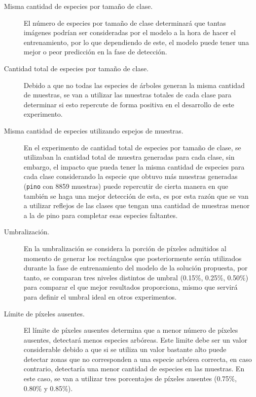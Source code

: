 \begin{description}
\item[Misma cantidad de especies por tamaño de clase.]{El número de especies por tamaño de clase determinará que tantas imágenes podrían ser consideradas por el modelo a la hora de hacer el entrenamiento, por lo que dependiendo de este, el modelo puede tener una mejor o peor predicción en la fase de detección.} 
\end{description}

\begin{description}
\item[Cantidad total de especies por tamaño de clase.]{Debido a que no todas las especies de árboles generan la misma cantidad de muestras, se van a utilizar las muestras totales de cada clase para determinar si esto repercute de forma positiva en el desarrollo de este experimento.}

\item[Misma cantidad de especies utilizando espejos de muestras.]{En el experimento de cantidad total de especies por tamaño de clase, se utilizaban la cantidad total de muestra generadas para cada clase, sin embargo, el impacto que pueda tener la misma cantidad de especies para cada clase considerando la especie que obtuvo más muestras generadas (\texttt{pino} con 8859 muestras) puede repercutir de cierta manera en que también se haga una mejor detección de esta, es por esta razón que se van a utilizar reflejos de las clases que tengan una cantidad de muestras menor a la de pino para completar esas especies faltantes.}

\item[Umbralización.]{En la umbralización se considera la porción de píxeles admitidos al momento de generar los rectángulos que posteriormente serán utilizados durante la fase de entrenamiento del modelo de la solución propuesta, por tanto, se comparan tres niveles distintos de umbral  (0.15\%, 0.25\%, 0.50\%) para comparar el que mejor resultados proporciona, mismo que servirá para definir el umbral ideal en otros experimentos.} 

\item[Límite de píxeles ausentes.]{El límite de píxeles ausentes determina que a menor número de píxeles ausentes, detectará menos especies arbóreas. Este limite debe ser un valor considerable debido a que si se utiliza un valor bastante alto puede detectar zonas que no corresponden a una especie arbórea correcta, en caso contrario, detectaría una menor cantidad de especies en las muestras. En este caso, se van a utilizar tres porcentajes de píxeles ausentes (0.75\%, 0.80\% y 0.85\%).}
\end{description}

